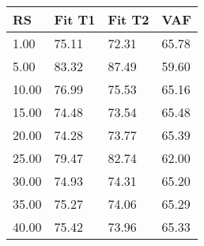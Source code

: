 \begin{tabular}{llll}
RS & Fit T1 & Fit T2 & VAF \\ 
\hline 
 1.00 & 75.11 & 72.31 & 65.78 \\ 
 5.00 & 83.32 & 87.49 & 59.60 \\ 
10.00 & 76.99 & 75.53 & 65.16 \\ 
15.00 & 74.48 & 73.54 & 65.48 \\ 
20.00 & 74.28 & 73.77 & 65.39 \\ 
25.00 & 79.47 & 82.74 & 62.00 \\ 
30.00 & 74.93 & 74.31 & 65.20 \\ 
35.00 & 75.27 & 74.06 & 65.29 \\ 
40.00 & 75.42 & 73.96 & 65.33 \\ 
\hline 
\end{tabular}